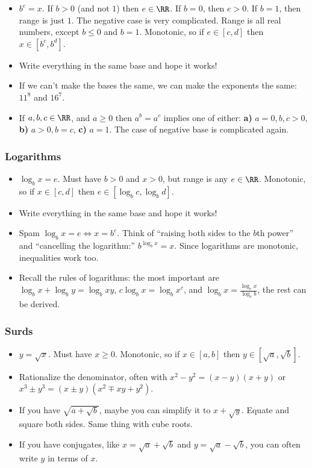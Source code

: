 \documentclass[10pt,paper=letter]{scrartcl}
\begin{document}
\begin{itemize}
  \item $b^e = x$. If $b > 0$ (and not $1$) then $e \in \RR$. If $b = 0$, then $e > 0$. If $b = 1$, then range is just $1$. The negative case is very complicated. Range is all real numbers, except $b \leq 0$ and $b = 1$. Monotonic, so if $e \in [c, d]$ then $x \in [b^c, b^d]$.
  \item Write everything in the same base and hope it works!
  \item If we can't make the bases the same, we can make the exponents the same: $11^8$ and $16^7$.
  \item If $a, b, c \in \RR$, and $a \geq 0$ then $a^b = a^c$ implies one of either: \textbf{a)} $a = 0, b, c > 0$, \textbf{b)} $a > 0, b = c$, \textbf{c)} $a = 1$. The case of negative base is complicated again.
\end{itemize}

\subsubsection*{Logarithms}

\begin{itemize}
  \item $\log_b x = e$. Must have $b > 0$ and $x > 0$, but range is any $e \in \RR$. Monotonic, so if $x \in [c, d]$ then $e \in [\log_b c, \log_b d]$.
  \item Write everything in the same base and hope it works!
  \item Spam $\log_b x = e \iff x = b^e$. Think of ``raising both sides to the $b$th power'' and ``cancelling the logarithm:'' $b^{\log_b x} = x$. Since logarithms are monotonic, inequalities work too.
  \item Recall the rules of logarithms: the most important are $\log_b x + \log_b y = \log_b xy$, $c\log_b x = \log_b x^c$, and $\log_b x = \frac{\log_c x}{\log_c b}$, the rest can be derived.
\end{itemize}

\newpage

\subsubsection*{Surds}

\begin{itemize}
  \item $y = \sqrt{x}$. Must have $x \geq 0$. Monotonic, so if $x \in [a, b]$ then $y \in [\sqrt{a}, \sqrt{b}]$.
  \item Rationalize the denominator, often with $x^2 - y^2 = (x-y)(x+y)$ or $x^3 \pm y^3 = (x\pm y)(x^2 \mp xy + y^2)$.
  \item If you have $\sqrt{a + \sqrt{b}}$, maybe you can simplify it to $x + \sqrt{y}$. Equate and square both sides. Same thing with cube roots. 
  \item If you have conjugates, like $x = \sqrt{a} + \sqrt{b}$ and $y = \sqrt{a} - \sqrt{b}$, you can often write $y$ in terms of $x$.
\end{itemize}
\end{document}
